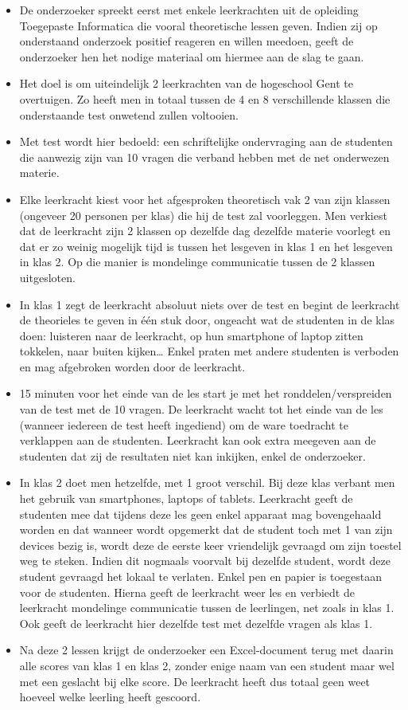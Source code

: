 \begin{itemize}
	\item De onderzoeker spreekt eerst met enkele leerkrachten uit de opleiding Toegepaste Informatica die vooral theoretische lessen geven. Indien zij op onderstaand onderzoek positief reageren en willen meedoen, geeft de onderzoeker hen het nodige materiaal om hiermee aan de slag te gaan.
	\item Het doel is om uiteindelijk 2 leerkrachten van de hogeschool Gent te overtuigen. Zo heeft men in totaal tussen de 4 en 8 verschillende klassen die onderstaande test onwetend zullen voltooien.
	\item Met test wordt hier bedoeld: een schriftelijke ondervraging aan de studenten die aanwezig zijn van 10 vragen die verband hebben met de net onderwezen materie.
	\item Elke leerkracht kiest voor het afgesproken theoretisch vak 2 van zijn klassen (ongeveer 20 personen per klas) die hij de test zal voorleggen. Men verkiest dat de leerkracht zijn 2 klassen op dezelfde dag dezelfde materie voorlegt en dat er zo weinig mogelijk tijd is tussen het lesgeven in klas 1 en het lesgeven in klas 2. Op die manier is mondelinge communicatie tussen de 2 klassen uitgesloten.
	\item In klas 1 zegt de leerkracht absoluut niets over de test en begint de leerkracht de theorieles te geven in één stuk door, ongeacht wat de studenten in de klas doen: luisteren naar de leerkracht, op hun smartphone of laptop zitten tokkelen, naar buiten kijken… Enkel praten met andere studenten is verboden en mag afgebroken worden door de leerkracht.
	\item 15 minuten voor het einde van de les start je met het ronddelen/verspreiden van de test met de 10 vragen. De leerkracht wacht tot het einde van de les (wanneer iedereen de test heeft ingediend) om de ware toedracht te verklappen aan de studenten. Leerkracht kan ook extra meegeven aan de studenten dat zij de resultaten niet kan inkijken, enkel de onderzoeker.
	\item In klas 2 doet men hetzelfde, met 1 groot verschil. Bij deze klas verbant men het gebruik van smartphones, laptops of tablets. Leerkracht geeft de studenten mee dat tijdens deze les geen enkel apparaat mag bovengehaald worden en dat wanneer wordt opgemerkt dat de student toch met 1 van zijn devices bezig is, wordt deze de eerste keer vriendelijk gevraagd om zijn toestel weg te steken. Indien dit nogmaals voorvalt bij dezelfde student, wordt deze student gevraagd het lokaal te verlaten. Enkel pen en papier is toegestaan voor de studenten. Hierna geeft de leerkracht weer les en verbiedt de leerkracht mondelinge communicatie tussen de leerlingen, net zoals in klas 1. Ook geeft de leerkracht hier dezelfde test met dezelfde vragen als klas 1. 
	\item Na deze 2 lessen krijgt de onderzoeker een Excel-document terug met daarin alle scores van klas 1 en klas 2, zonder enige naam van een student maar wel met een geslacht bij elke score. De leerkracht heeft dus totaal geen weet hoeveel welke leerling heeft gescoord.
\end{itemize}

